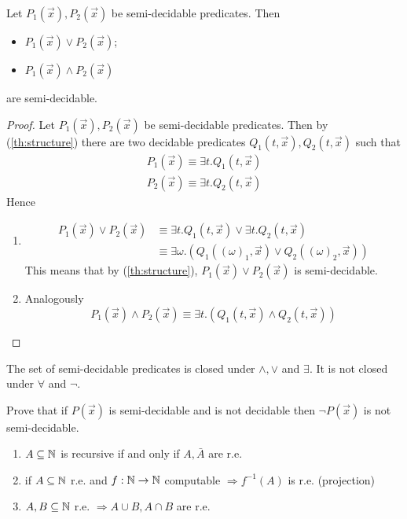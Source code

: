 \begin{theorem}
  Let $P_1(\vec{x}), P_2(\vec{x})$ be semi-decidable predicates. Then
  \begin{itemize}
  \item $ P_1(\vec{x}) \lor P_2(\vec{x})$;
  \item $P_1(\vec{x}) \land P_2(\vec{x})$
  \end{itemize}
  are semi-decidable.
  \begin{proof}
    Let $P_1(\vec{x}), P_2(\vec{x})$ be semi-decidable
    predicates. Then by (\ref{th:structure}) there are two
    decidable predicates \( Q_1(t, \vec{x}), Q_2(t, \vec{x})\) such that
    \begin{gather*}
      P_1(\vec{x}) \equiv \exists t . Q_1(t, \vec{x}) \\
      P_2(\vec{x}) \equiv \exists t . Q_2(t, \vec{x})
    \end{gather*}
    Hence
    \begin{enumerate}[label=(\arabic*)]
    \item
      \[
        \begin{split}
          P_1(\vec{x}) \lor P_2(\vec{x}) &\equiv \exists t .
          Q_1(t, \vec{x}) \lor \exists t . Q_2(t, \vec{x}) \\
          &\equiv \exists \omega . (Q_1((\omega)_1, \vec{x})
          \lor Q_2((\omega)_2, \vec{x}))
        \end{split}
      \]
      This means that by (\ref{th:structure}),
      $P_1(\vec{x}) \lor P_2(\vec{x})$ is semi-decidable.
    \item Analogously
      \[
        P_1(\vec{x}) \land P_2(\vec{x}) \equiv \exists t .
        (Q_1(t, \vec{x}) \land Q_2(t, \vec{x}))
      \]
    \end{enumerate}
  \end{proof}
\end{theorem}

\begin{observation}
  The set of semi-decidable predicates is closed under $\land, \lor$
  and $\exists$. It is not closed under $\forall$ and $\lnot$.
\end{observation}

\begin{exercise}
  Prove that if $P(\vec{x})$ is semi-decidable and is not decidable
  then $\lnot P(\vec{x})$ is not semi-decidable.
\end{exercise}

\begin{observation}
  \begin{enumerate}[label=(\arabic*)]
  \item $A \subseteq \mathbb{N}$ is recursive if and only if $A, \bar{A}$ are r.e.
  \item if $A \subseteq \mathbb{N}$ r.e. and $f : \mathbb{N} \to \mathbb{N}$ computable
    $\Rightarrow f^{-1}(A)$ is r.e. (projection)
  \item $A,B \subseteq \mathbb{N}$ r.e. $\Rightarrow A \cup B, A \cap B$
    are r.e.
  \end{enumerate}
\end{observation}

